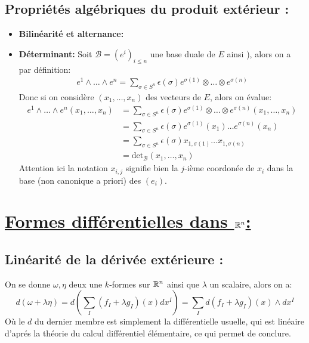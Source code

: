    \subsection*{Propriétés algébriques du produit extérieur {:}}
      \begin{itemize}
         \item \textbf{Bilinéarité et alternance:}
         \item \textbf{Déterminant:} Soit \( \mathcal{B} = (e^i)_{i \leq n} \) une base duale de \( E \) ainsi ), alors on a par définition:
         \begin{align*}
            e^1 \wedge \ldots \wedge e^n = \sum_{\sigma \in S^n} \epsilon(\sigma) e^{\sigma(1)} \otimes \ldots \otimes e^{\sigma(n)}
         \end{align*}
         Donc si on considère \( (x_1, \ldots, x_n) \) des vecteurs de \( E \), alors on évalue:
         \begin{align*}
            e^1 \wedge \ldots \wedge e^n(x_1, \ldots, x_n) &= \sum_{\sigma \in S^n} \epsilon(\sigma) e^{\sigma(1)} \otimes \ldots \otimes e^{\sigma(n)}(x_1, \ldots, x_n)\\
            &= \sum_{\sigma \in S^n} \epsilon(\sigma) e^{\sigma(1)}(x_1) \ldots e^{\sigma(n)}(x_n)\\
            &= \sum_{\sigma \in S^n} \epsilon(\sigma) x_{1, \sigma(1)} \ldots x_{1, \sigma(n)}\\
            &= \text{det}_\mathcal{B}(x_1, \ldots, x_n)
         \end{align*}
         Attention ici la notation \( x_{i,j} \) signifie bien la \( j \)-ième coordonée de \( x_i \) dans la base (non canonique a priori) des \( (e_i) \).
\end{itemize}

\pagebreak

\section*{\uline{Formes différentielles dans \( \mathbb{R}^n \){:}}}
   \subsection*{Linéarité de la dérivée extérieure {:}}
   On se donne \( \omega, \eta \) deux une \( k \)-formes sur \( \mathbb{R}^n \) ainsi que \( \lambda \) un scalaire, alors on a:
   \[ 
      d( \omega + \lambda\eta) = d\left( \sum_I (f_I + \lambda g_I)(x) dx^I\right) = \sum_I d(f_I + \lambda g_I)(x) \wedge dx^I
   \]
   Où le \( d \) du dernier membre est simplement la différentielle usuelle, qui est linéaire d'aprés la théorie du calcul différentiel élémentaire, ce qui permet de conclure.
